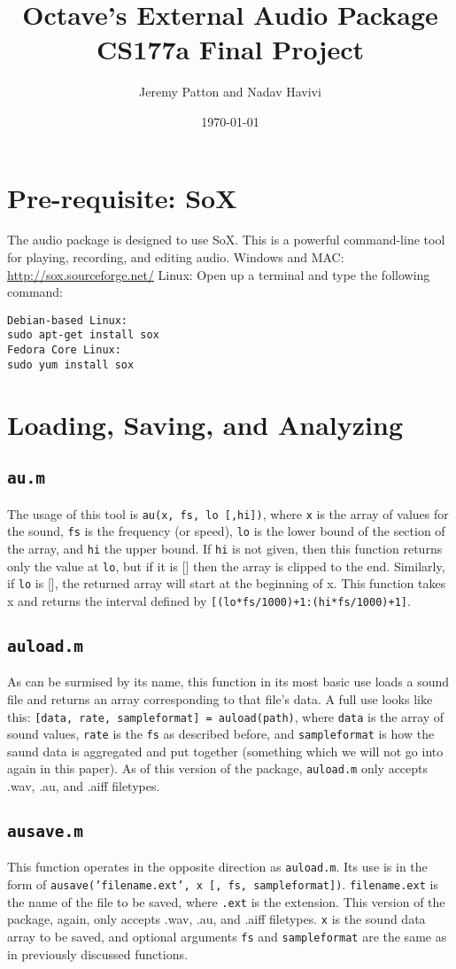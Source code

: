 ﻿\documentclass[12pt]{article}
\title{Octave's External Audio Package \\ CS177a Final Project}
\author{Jeremy Patton and Nadav Havivi}
\date{\today}
\begin{document}
\maketitle 
\section{Pre-requisite: SoX}
The audio package is designed to use SoX. This is a powerful command-line tool for playing, recording, and editing audio.
Windows and MAC: \url{http://sox.sourceforge.net/}
Linux: Open up a terminal and type the following command:
\begin{verbatim}
Debian-based Linux:
sudo apt-get install sox
Fedora Core Linux:
sudo yum install sox
\end{verbatim}
\section{Loading, Saving, and Analyzing}
\subsection{\texttt{au.m}}
The usage of this tool is \texttt{au(x, fs, lo [,hi])}, where \texttt{x} is the array of values for the sound,  \texttt{fs} is the frequency (or speed),  \texttt{lo} is the lower bound of the section of the array, and  \texttt{hi} the upper bound. If  \texttt{hi} is not given, then this function returns only the value at  \texttt{lo}, but if it is [] then the array is clipped to the end. Similarly, if  \texttt{lo} is [], the returned array will start at the beginning of x. This function takes x and returns the interval defined by  \texttt{[(lo*fs/1000)+1:(hi*fs/1000)+1]}.
\subsection{\texttt{auload.m}}
As can be surmised by its name, this function in its most basic use loads a sound file and returns an array corresponding to that file's data. A full use looks like this: \texttt{[data, rate, sampleformat] = auload(path)}, where \texttt{data} is the array of sound values, \texttt{rate} is the \texttt{fs} as described before, and \texttt{sampleformat} is how the saund data is aggregated and put together (something which we will not go into again in this paper). As of this version of the package, \texttt{auload.m} only accepts .wav, .au, and .aiff filetypes.
\subsection{\texttt{ausave.m}}
This function operates in the opposite direction as \texttt{auload.m}. Its use is in the form of \texttt{ausave('filename.ext', x [, fs, sampleformat])}. \texttt{filename.ext} is the name of the file to be saved, where \texttt{.ext} is the extension. This version of the package, again, only accepts .wav, .au, and .aiff filetypes. \texttt{x} is the sound data array to be saved, and optional arguments \texttt{fs} and \texttt{sampleformat} are the same as in previously discussed functions. 
\end{document}

